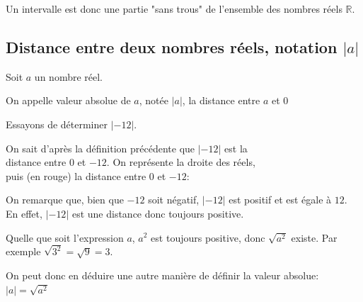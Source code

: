 \begin{rem}{}{}
	Un intervalle est donc une partie "sans trous" de l'ensemble des nombres réels $\mathbb{R}$.
\end{rem}

\subsection{Distance entre deux nombres réels, notation $|a|$}

\begin{defi}{}{}
Soit $a$ un nombre réel.

 On appelle valeur absolue de $a$, notée $|a|$, la distance entre $a$ et $0$
\end{defi}

\smallskip
\begin{ex}{}{}
Essayons de déterminer $|-12|$.\medskip 

 On sait d'après la définition précédente que $|-12|$ est la \\distance entre $0$ et $-12$. On représente la droite des réels, \\puis (en rouge) la distance entre $0$ et $-12$:

\vspace{-15mm}
\begin{flushright}
\end{flushright}

 On remarque que, bien que $-12$ soit négatif, $|-12|$ est positif et est égale à $12$. En effet, $|-12|$ est une distance donc toujours positive.
\end{ex}

\begin{rem}{}{}
Quelle que soit l'expression $a$, $a^2$ est toujours positive, donc $\sqrt{a^2}$ existe. Par exemple $\sqrt{3^2} = \sqrt{9} = 3$.

 On peut donc en déduire une autre manière de définir la valeur absolue: \quad $|a| = \sqrt{a^2}$
\end{rem}

